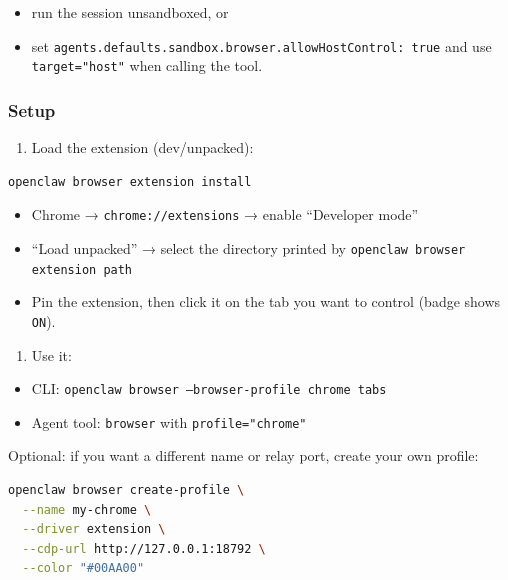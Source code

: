\begin{itemize}
  \item run the session unsandboxed, or
  \item set \texttt{agents.defaults.sandbox.browser.allowHostControl: true} and use \texttt{target="host"} when calling the tool.
\end{itemize}


\subsubsection{Setup}


\begin{enumerate}
  \item Load the extension (dev/unpacked):
\end{enumerate}


\begin{lstlisting}[language=bash]
openclaw browser extension install
\end{lstlisting}


\begin{itemize}
  \item Chrome → \texttt{chrome://extensions} → enable “Developer mode”
  \item “Load unpacked” → select the directory printed by \texttt{openclaw browser extension path}
  \item Pin the extension, then click it on the tab you want to control (badge shows \texttt{ON}).
\end{itemize}


\begin{enumerate}
  \item Use it:
\end{enumerate}


\begin{itemize}
  \item CLI: \texttt{openclaw browser --browser-profile chrome tabs}
  \item Agent tool: \texttt{browser} with \texttt{profile="chrome"}
\end{itemize}


Optional: if you want a different name or relay port, create your own profile:

\begin{lstlisting}[language=bash]
openclaw browser create-profile \
  --name my-chrome \
  --driver extension \
  --cdp-url http://127.0.0.1:18792 \
  --color "#00AA00"
\end{lstlisting}


